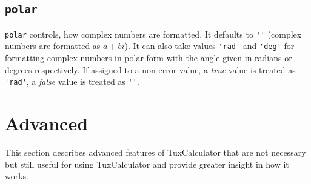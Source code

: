 \documentclass[10pt]{article}
\begin{document}
    \subsection{\texttt{polar}}\label{subsec:polar}
    \verb|polar| controls, how complex numbers are formatted.
    It defaults to \verb|''| (complex numbers are formatted as $ a + bi $).
    It can also take values \verb|'rad'| and \verb|'deg'| for formatting complex numbers in polar form with the angle given in radians or degrees respectively.
    If assigned to a non-error value, a \textsl{true} value is treated as \verb|'rad'|, a \textsl{false} value is treated as \verb|''|.
    
    \section{Advanced}\label{sec:advanced}
    This section describes advanced features of TuxCalculator that are not necessary but still useful for using TuxCalculator and provide greater insight in how it works.
    
\end{document}
